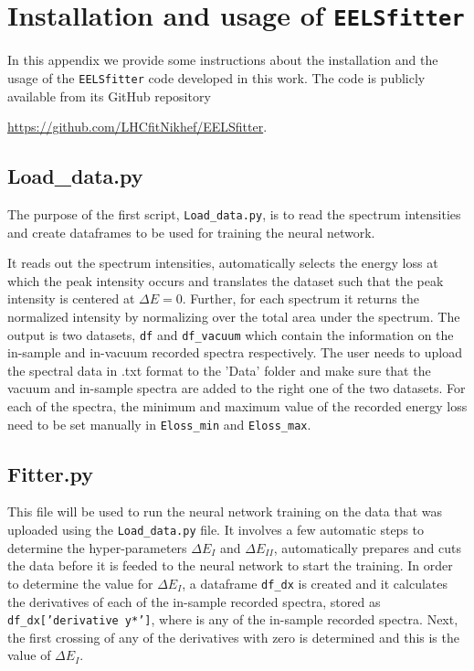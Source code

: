 
\section{Installation and usage of {\tt EELSfitter}}
\label{sec:installation}

In this appendix we provide some instructions about the installation
and the usage of the {\tt EELSfitter} code developed
in this work.
%
The code is publicly available from its GitHub repository
\begin{center}
\url{https://github.com/LHCfitNikhef/EELSfitter}.
\end{center}

\subsection*{Load\_data.py}
The purpose of the first script, {\tt Load\_data.py}, is to read the spectrum
intensities and create dataframes to be used for training the neural network.
%

It reads out the spectrum intensities, automatically selects the energy loss
at which the peak intensity occurs and translates the dataset such that
the peak intensity is centered at $\Delta E =$0. 
%
Further, for each spectrum it returns the normalized intensity by normalizing
over the total area under the spectrum. 
%
The output is two datasets, {\tt df} and {\tt df\_vacuum} which contain the 
information on the in-sample and in-vacuum recorded spectra respectively. 
%
The user needs to upload the spectral data in .txt format to the 'Data' folder
and make sure that the vacuum and in-sample spectra are added to the right one
of the two datasets. 
%
For each of the spectra, the minimum and maximum value of the recorded energy 
loss need to be set manually in {\tt Eloss\_min} and {\tt Eloss\_max}.

\subsection*{Fitter.py}
This file will be used to run the neural network training on the data that was 
uploaded using the {\tt Load\_data.py} file.
%
It involves a few automatic steps to determine the hyper-parameters $\Delta E_I$
and $\Delta E_{II}$, automatically prepares and cuts the data before it is feeded
to the neural network to start the training. 
%
In order to determine the value for $\Delta E_I$, a dataframe {\tt df\_dx} is created
and it calculates the derivatives of each of the in-sample recorded spectra, 
stored as {\tt df\_dx['derivative y*']}, where {\tt *} is any of the in-sample recorded spectra.
%
Next, the first crossing of any of the derivatives with zero is determined 
and this is the value of $\Delta E_I$. 
